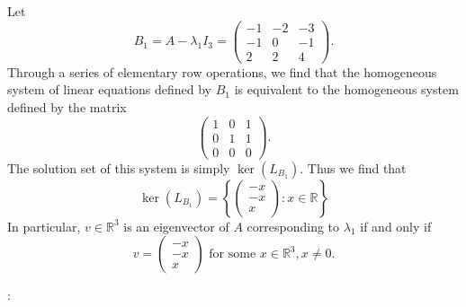 \documentclass[12pt]{article}
\begin{document}
\begin{enumerate}
\begin{enumerate}
\begin{enumerate}[label=(\roman*)]
Let
\begin{equation*}
B_1 = A - \lambda_1 I_3
= \begin{pmatrix}
-1 & -2 & -3 \\
-1 & 0 & -1 \\
2 & 2 & 4
\end{pmatrix}.
\end{equation*}
Through a series of elementary row operations, we find that the homogeneous system of linear equations defined by $B_1$ is equivalent to the homogeneous system defined by the matrix
\begin{equation*}
\begin{pmatrix}
1 & 0 & 1 \\
0 & 1 & 1 \\
0 & 0 & 0
\end{pmatrix}.
\end{equation*}
The solution set of this system is simply $\ker(L_{B_1})$. Thus we find that
\begin{equation*}
\ker(L_{B_1}) = \left\{
\begin{pmatrix}
-x \\
-x \\
x
\end{pmatrix} : x \in \mathbb{R}
\right\}
\end{equation*}
In particular, $v \in \mathbb{R}^3$ is an eigenvector of $A$ corresponding to $\lambda_1$ if and only if
\begin{equation*}
v = \begin{pmatrix}
-x \\
-x \\
x
\end{pmatrix} \text{ for some } x \in \mathbb{R}^3, x \neq 0.
\end{equation*}

:


\end{enumerate}
\end{enumerate}
\end{enumerate}
\end{document}
